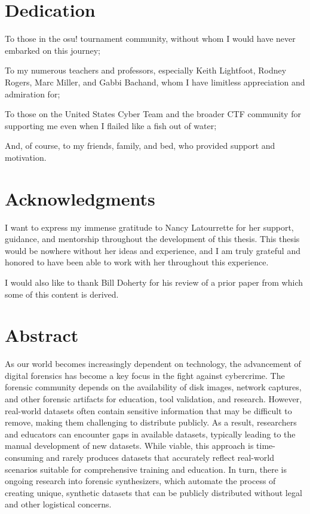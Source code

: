 \section{Dedication}\label{dedication}

To those in the osu! tournament community, without whom I would have
never embarked on this journey;

To my numerous teachers and professors, especially Keith Lightfoot,
Rodney Rogers, Marc Miller, and Gabbi Bachand, whom I have limitless
appreciation and admiration for;

To those on the United States Cyber Team and the broader CTF community
for supporting me even when I flailed like a fish out of water;

And, of course, to my friends, family, and bed, who provided support and
motivation.

\section{Acknowledgments}\label{acknowledgments}

I want to express my immense gratitude to Nancy Latourrette for her
support, guidance, and mentorship throughout the development of this
thesis. This thesis would be nowhere without her ideas and experience,
and I am truly grateful and honored to have been able to work with her
throughout this experience.

I would also like to thank Bill Doherty for his review of a prior paper
from which some of this content is derived.

\section{Abstract}\label{abstract}

As our world becomes increasingly dependent on technology, the
advancement of digital forensics has become a key focus in the fight
against cybercrime. The forensic community depends on the availability
of disk images, network captures, and other forensic artifacts for
education, tool validation, and research. However, real-world datasets
often contain sensitive information that may be difficult to remove,
making them challenging to distribute publicly. As a result, researchers
and educators can encounter gaps in available datasets, typically
leading to the manual development of new datasets. While viable, this
approach is time-consuming and rarely produces datasets that accurately
reflect real-world scenarios suitable for comprehensive training and
education. In turn, there is ongoing research into forensic
synthesizers, which automate the process of creating unique, synthetic
datasets that can be publicly distributed without legal and other
logistical concerns.

